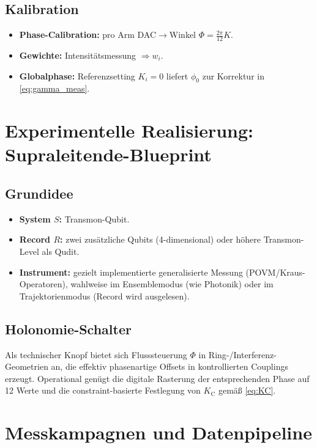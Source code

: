 \documentclass[11pt,a4paper]{article}
\newcommand{\CC}{\mathrm{C}}
\begin{document}
	\subsection{Kalibration}
	
	\begin{itemize}
		\item \textbf{Phase-Calibration:} pro Arm DAC\(\rightarrow\)Winkel \(\Phi=\frac{2\pi}{12}K\).
		\item \textbf{Gewichte:} Intensitätsmessung \(\Rightarrow w_i\).
		\item \textbf{Globalphase:} Referenzsetting \(K_i=0\) liefert \(\phi_0\) zur Korrektur in \eqref{eq:gamma_meas}.
	\end{itemize}
	
	\section{Experimentelle Realisierung: Supraleitende-Blueprint}
	
	\subsection{Grundidee}
	
	\begin{itemize}
		\item \textbf{System \(S\):} Transmon-Qubit.
		\item \textbf{Record \(R\):} zwei zusätzliche Qubits (4-dimensional) oder höhere Transmon-Level als Qudit.
		\item \textbf{Instrument:} gezielt implementierte generalisierte Messung (POVM/Kraus-Operatoren), wahlweise
		im Ensemblemodus (wie Photonik) oder im Trajektorienmodus (Record wird ausgelesen).
	\end{itemize}
	
	\subsection{Holonomie-Schalter}
	
	Als technischer Knopf bietet sich Flusssteuerung \(\Phi\) in Ring-/Interferenz-Geometrien an, die effektiv
	phasenartige Offsets in kontrollierten Couplings erzeugt. Operational genügt die digitale Rasterung der
	entsprechenden Phase auf 12 Werte und die constraint-basierte Festlegung von \(K_\CC\) gemäß \eqref{eq:KC}.
	
	\section{Messkampagnen und Datenpipeline}
	
\end{document}
